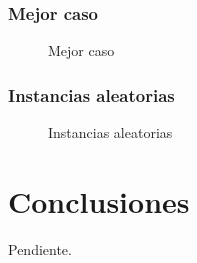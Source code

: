 \documentclass[a4paper, 10pt, twoside]{article}
\begin{document}
\subsubsection{Mejor caso}

\begin{figure}[H]
  \centering
  
  \caption{Mejor caso}
\end{figure}


\subsubsection{Instancias aleatorias}

\begin{figure}[H]
  \centering
  
  \caption{Instancias aleatorias}
\end{figure}




\newpage

\section{Conclusiones}

Pendiente.




\newpage
\end{document}
